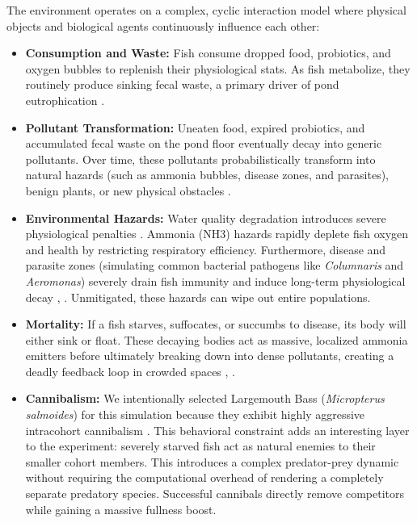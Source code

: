 \documentclass[conference]{IEEEtran}
\begin{document}
The environment operates on a complex, cyclic interaction model where physical objects and biological agents continuously influence each other:
\begin{itemize}
    \item \textbf{Consumption and Waste:} Fish consume dropped food, probiotics, and oxygen bubbles to replenish their physiological stats. As fish metabolize, they routinely produce sinking fecal waste, a primary driver of pond eutrophication \cite{zhang}.
    \item \textbf{Pollutant Transformation:} Uneaten food, expired probiotics, and accumulated fecal waste on the pond floor eventually decay into generic pollutants. Over time, these pollutants probabilistically transform into natural hazards (such as ammonia bubbles, disease zones, and parasites), benign plants, or new physical obstacles \cite{zhang}.
    \item \textbf{Environmental Hazards:} Water quality degradation introduces severe physiological penalties \cite{zhang}. Ammonia (NH3) hazards rapidly deplete fish oxygen and health by restricting respiratory efficiency. Furthermore, disease and parasite zones (simulating common bacterial pathogens like \textit{Columnaris} and \textit{Aeromonas}) severely drain fish immunity and induce long-term physiological decay \cite{bowker}, \cite{wang2025}. Unmitigated, these hazards can wipe out entire populations.
    \item \textbf{Mortality:} If a fish starves, suffocates, or succumbs to disease, its body will either sink or float. These decaying bodies act as massive, localized ammonia emitters before ultimately breaking down into dense pollutants, creating a deadly feedback loop in crowded spaces \cite{zhang}, \cite{bowker}.
    \item \textbf{Cannibalism:} We intentionally selected Largemouth Bass (\textit{Micropterus salmoides}) for this simulation because they exhibit highly aggressive intracohort cannibalism \cite{post}. This behavioral constraint adds an interesting layer to the experiment: severely starved fish act as natural enemies to their smaller cohort members. This introduces a complex predator-prey dynamic without requiring the computational overhead of rendering a completely separate predatory species. Successful cannibals directly remove competitors while gaining a massive fullness boost.
\end{itemize}
\end{document}
